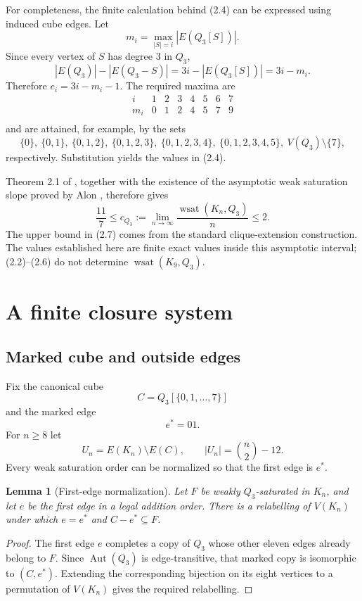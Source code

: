 \documentclass[11pt]{article}
\numberwithin{equation}{section}
\newtheorem{lemma}[theorem]{Lemma}
\newcommand{\wsat}{\operatorname{wsat}}
\newcommand{\Aut}{\operatorname{Aut}}
\begin{document}
For completeness, the finite calculation behind (2.4) can be expressed using induced cube edges. Let
\[
m_i=\max_{|S|=i}|E(Q_3[S])|.
\]
Since every vertex of $S$ has degree $3$ in $Q_3$,
\[
|E(Q_3)|-|E(Q_3-S)|=3i-|E(Q_3[S])|=3i-m_i.
\]
Therefore $e_i=3i-m_i-1$. The required maxima are
\[
\begin{array}{c|ccccccc}
i&1&2&3&4&5&6&7\\ \hline
m_i&0&1&2&4&5&7&9\\
\end{array}
\]
and are attained, for example, by the sets
\[
\{0\},\ \{0,1\},\ \{0,1,2\},\ \{0,1,2,3\},\ \{0,1,2,3,4\},\ \{0,1,2,3,4,5\},\ V(Q_3)\setminus\{7\},
\]
respectively. Substitution yields the values in (2.4).

Theorem 2.1 of \cite{TZ2025}, together with the existence of the asymptotic weak saturation slope proved by Alon \cite{Alon1985}, therefore gives
\[
\frac{11}{7}\le c_{Q_3}:=\lim_{n\to\infty}\frac{\wsat(K_n,Q_3)}{n}\le 2.
\tag{2.7}
\]
The upper bound in (2.7) comes from the standard clique-extension construction. The values established here are finite exact values inside this asymptotic interval; (2.2)--(2.6) do not determine $\wsat(K_9,Q_3)$.

\section{A finite closure system}\label{sec:closure}

\subsection{Marked cube and outside edges}
Fix the canonical cube
\[
C=Q_3[\{0,1,\ldots,7\}]
\]
and the marked edge
\[
e^*=01.
\]
For $n\ge8$ let
\[
U_n=E(K_n)\setminus E(C),
\qquad |U_n|=\binom n2-12.
\tag{3.1}
\]
Every weak saturation order can be normalized so that the first edge is $e^*$.

\begin{lemma}[First-edge normalization]\label{lem:first}
Let $F$ be weakly $Q_3$-saturated in $K_n$, and let $e$ be the first edge in a legal addition order. There is a relabelling of $V(K_n)$ under which $e=e^*$ and $C-e^*\subseteq F$.
\end{lemma}

\begin{proof}
The first edge $e$ completes a copy of $Q_3$ whose other eleven edges already belong to $F$. Since $\Aut(Q_3)$ is edge-transitive, that marked copy is isomorphic to $(C,e^*)$. Extending the corresponding bijection on its eight vertices to a permutation of $V(K_n)$ gives the required relabelling.
\end{proof}
\end{document}
